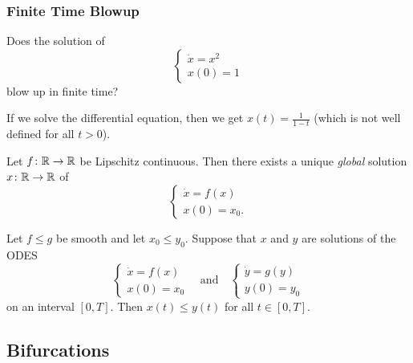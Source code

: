 \documentclass[class=article, crop=false]{standalone}
\begin{document}
  \subsubsection{Finite Time Blowup}
  \begin{example}{}
    Does the solution of 
    \[
      \begin{cases}
        \dot{x} = x^2 \\ 
        x(0) = 1
      \end{cases}
    \]
    blow up in finite time? \par
    If we solve the differential equation, then we get $x(t) = \frac{1}{1 - t}$ (which is not well defined for all $t > 0$).
  \end{example}
  \begin{theorem}{}
    Let $f\colon \mathbb{R}\to \mathbb{R}$ be Lipschitz continuous. Then there exists a unique \emph{global} solution $x\colon \mathbb{R}\to \mathbb{R}$ of
    \[
      \begin{cases}
        \dot{x} = f(x) \\
        x(0) = x_0.
      \end{cases}
    \]
  \end{theorem}
  \begin{theorem}{}
    Let $f\leq g$ be smooth and let $x_0\leq y_0$. Suppose that $x$ and $y$ are solutions of the ODES
    \[
      \begin{cases}
        \dot{x} = f(x) \\
        x(0) = x_0
      \end{cases}\quad\text{and}\quad
      \begin{cases}
        \dot{y} = g(y) \\
        y(0) = y_0
      \end{cases}
    \]
    on an interval $[0, T]$. Then $x(t)\leq y(t)$ for all $t\in [0, T]$.
  \end{theorem}
  \subsection{Bifurcations}
\end{document}
